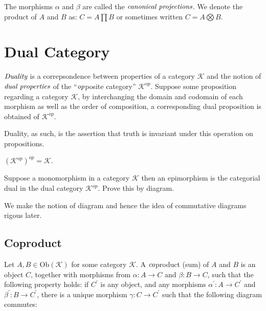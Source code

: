 \documentclass[10pt, oneside, reqno]{amsart}
\begin{document}
The morphisms $\alpha$ and $\beta$ are called the $\emph{canonical projections}$.
We denote the product of $A$ and $B$ as: $C = A \prod B$ or sometimes written $C = A \bigotimes B$.

\section{Dual Category} %
\label{sec:dualcategory}
$\emph{Duality}$ is a correpsondence between properties of a category $\mathcal{K}$ and the notion
of $\emph{dual properties}$ of the ``$\emph{op}$posite category'' $\mathcal{K}^{op}$. Suppose some proposition
regarding a category $\mathcal{K}$, by interchanging the domain and codomain of each morphism as well as
the order of composition, a corresponding dual proposition is obtained of $\mathcal{K}^{op}$.

Duality, as such, is the assertion that truth is invariant under this operation on propositions.
\begin{lem}
 $(\mathcal{K}^{op})^{op} = \mathcal{K}$.
\end{lem}

\begin{exmp}
 Suppose a monomorphism in a category $\mathcal{K}$ then an epimorphism is the categorial dual
 in the dual category $\mathcal{K}^{op}$. Prove this by diagram.
\end{exmp}

\begin{rem}
 We make the notion of diagram and hence the idea of commutative diagrams rigous later.
\end{rem}

\subsection{Coproduct} %
\label{subsec:coproduct}
Let $A,B \in \text{Ob}(\mathcal{K})$ for some category $\mathcal{K}$.
A $\emph{co}$product (sum) of $A$ and $B$ is an object $C$, together with morphisms from
$\alpha: A \to C$ and $\beta: B \to C$, such that the following property holds:
if $C^{'}$ is any object, and any morphisms $\alpha^{'}: A \to C^{'}$ and $\beta^{'}: B \to C^{'}$,
there is a unique morphism $\gamma: C \to C^{'}$ such that the following diagram commutes:

\end{document}
